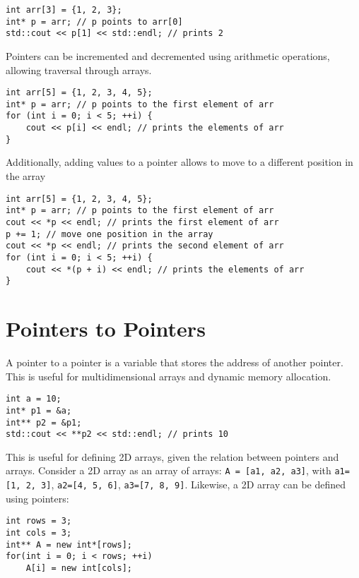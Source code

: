 \documentclass{article}
\begin{document}
\begin{verbatim}
int arr[3] = {1, 2, 3};
int* p = arr; // p points to arr[0]
std::cout << p[1] << std::endl; // prints 2
\end{verbatim}

Pointers can be incremented and decremented using arithmetic operations, allowing traversal through arrays.

\begin{verbatim}
int arr[5] = {1, 2, 3, 4, 5};
int* p = arr; // p points to the first element of arr
for (int i = 0; i < 5; ++i) {
    cout << p[i] << endl; // prints the elements of arr
}
\end{verbatim}

Additionally, adding values to a pointer allows to move to a different position in the array
\begin{verbatim}
int arr[5] = {1, 2, 3, 4, 5};
int* p = arr; // p points to the first element of arr
cout << *p << endl; // prints the first element of arr
p += 1; // move one position in the array
cout << *p << endl; // prints the second element of arr
for (int i = 0; i < 5; ++i) {
    cout << *(p + i) << endl; // prints the elements of arr
}
\end{verbatim}

\section{Pointers to Pointers}
A pointer to a pointer is a variable that stores the address of another pointer. This is useful for multidimensional arrays and dynamic memory allocation.

\begin{verbatim}
int a = 10;
int* p1 = &a;
int** p2 = &p1;
std::cout << **p2 << std::endl; // prints 10
\end{verbatim}

This is useful for defining 2D arrays, given the relation between pointers and arrays.
Consider a 2D array as an array of arrays: \verb|A = [a1, a2, a3]|, with \verb|a1=[1, 2, 3]|, \verb|a2=[4, 5, 6]|, \verb|a3=[7, 8, 9]|. Likewise, a 2D array can be defined using pointers:

\begin{verbatim}
int rows = 3;
int cols = 3;
int** A = new int*[rows];
for(int i = 0; i < rows; ++i)
    A[i] = new int[cols];
\end{verbatim}
\end{document}
